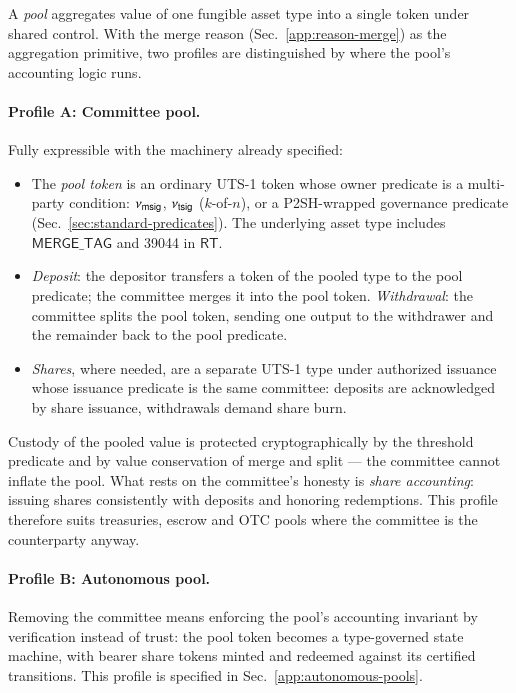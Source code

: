 A \emph{pool} aggregates value of one fungible asset type into a single token under shared control. With the merge reason (Sec.~\ref{app:reason-merge}) as the aggregation primitive, two profiles are distinguished by where the pool's accounting logic runs.

\paragraph{Profile A: Committee pool.} Fully expressible with the machinery already specified:
\begin{itemize}
	\item The \emph{pool token} is an ordinary UTS-1 token whose owner predicate is a multi-party condition: $\nu_\mathsf{msig}$, $\nu_\mathsf{tsig}$ ($k$-of-$n$), or a P2SH-wrapped governance predicate (Sec.~\ref{sec:standard-predicates}). The underlying asset type includes $\mathsf{MERGE\_TAG}$ and 39044 in $\mathsf{RT}$.
	\item \emph{Deposit}: the depositor transfers a token of the pooled type to the pool predicate; the committee merges it into the pool token. \emph{Withdrawal}: the committee splits the pool token, sending one output to the withdrawer and the remainder back to the pool predicate.
	\item \emph{Shares}, where needed, are a separate UTS-1 type under authorized issuance whose issuance predicate is the same committee: deposits are acknowledged by share issuance, withdrawals demand share burn.
\end{itemize}
Custody of the pooled value is protected cryptographically by the threshold predicate and by value conservation of merge and split --- the committee cannot inflate the pool. What rests on the committee's honesty is \emph{share accounting}: issuing shares consistently with deposits and honoring redemptions. This profile therefore suits treasuries, escrow and OTC pools where the committee is the counterparty anyway.

\paragraph{Profile B: Autonomous pool.} Removing the committee means enforcing the pool's accounting invariant by verification instead of trust: the pool token becomes a type-governed state machine, with bearer share tokens minted and redeemed against its certified transitions. This profile is specified in Sec.~\ref{app:autonomous-pools}.

